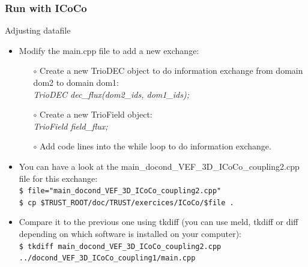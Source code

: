 \documentclass[10pt, hyperref={unicode=true,pdfusetitle, bookmarks=true,bookmarksnumbered=false,bookmarksopen=false, breaklinks=false,pdfborder={0 0 1},backref=true,colorlinks=true,linkcolor=darkblue,pageanchor, urlcolor=darkblue}]{beamer}
\begin{document}
\begin{frame}
\frametitle{Run with ICoCo}

\begin{block}{Adjusting datafile}
\begin{itemize}
\item Modify the main.cpp file to add a new exchange:\\
    \begin{itemize}
    \item [$\circ$] Create a new TrioDEC object to do information exchange from domain dom2 to domain dom1: \\
    \textit{TrioDEC dec\_flux(dom2\_ids, dom1\_ids);}
    \item [$\circ$] Create a new TrioField object: \\
    \textit{TrioField field\_flux;}
    \item [$\circ$] Add code lines into the while loop to do information exchange.
    \end{itemize}
\item You can have a look at the main\_docond\_VEF\_3D\_ICoCo\_coupling2.cpp file for this exchange:\\
\texttt{\$ file="main\_docond\_VEF\_3D\_ICoCo\_coupling2.cpp"} \\
\texttt{\$ cp \$TRUST\_ROOT/doc/TRUST/exercices/ICoCo/\$file . }

\item Compare it to the previous one using tkdiff (you can use meld, tkdiff or diff depending on which software is installed on your computer):\\
\texttt{\$ tkdiff main\_docond\_VEF\_3D\_ICoCo\_coupling2.cpp ../docond\_VEF\_3D\_ICoCo\_coupling1/main.cpp }

\end{itemize}
\end{block}

\end{frame}
\end{document}
